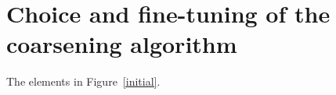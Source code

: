 \documentclass[runningheads]{llncs}
\begin{document}
\appendix

\section{Choice and fine-tuning of the coarsening algorithm}\label{ap}
The elements in Figure~\ref{initial}.



%
% 
% 
% 
% 
\end{document}
